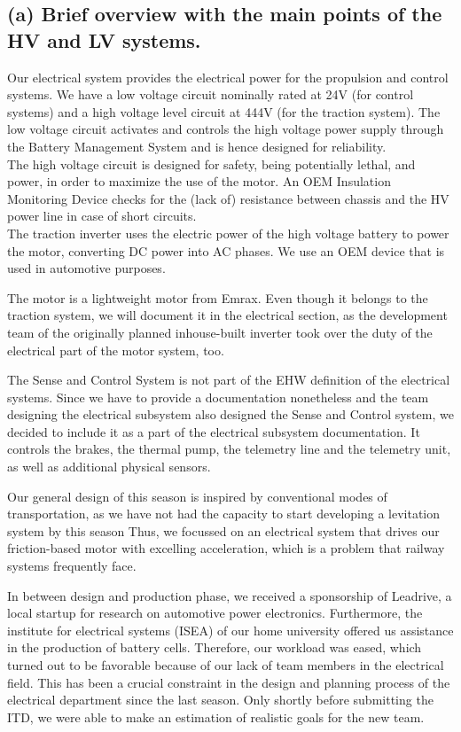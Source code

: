 \subsection{(a) Brief overview with the main points of the HV and LV systems.}
Our electrical system provides the electrical power for the propulsion and control systems. We have a low voltage circuit nominally rated at 24V (for control systems) and a high voltage level circuit at 444V (for the traction system).
The low voltage circuit activates and controls the high voltage power supply through the Battery Management System and is hence designed for reliability. \\
The high voltage circuit is designed for safety, being potentially lethal, and power, in order to maximize the use of the motor. An OEM Insulation Monitoring Device checks for the (lack of) resistance between chassis and the HV power line in case of short circuits. \\
The traction inverter uses the electric power of
the high voltage battery to power the motor, 
converting DC power into AC phases. We use an 
OEM device that is used in automotive purposes. 
\\
\par The motor is a lightweight motor from Emrax. Even though it belongs to the traction system,
we will document it in the electrical section, 
as the development team of the originally
planned inhouse-built inverter took over the 
duty of the electrical part of the
motor system, too.
\par The Sense and Control System is not part of the EHW definition of the electrical systems. Since we have to provide a documentation nonetheless and the team designing the electrical subsystem also designed the Sense and Control system, we decided to include it as a part of the electrical subsystem documentation. It controls the brakes, the thermal pump, the telemetry line and the telemetry unit, as well as additional physical sensors. 

\par Our general design of this season is inspired by conventional modes of transportation,
as we have not had the capacity to start developing a levitation system by this season
Thus, we focussed on an electrical system that drives our friction-based motor with
excelling acceleration, which is a problem that railway systems frequently face.

\par In between design and production phase, we received a sponsorship of Leadrive,
a local startup for research on automotive power electronics.
Furthermore, the institute for electrical systems (ISEA) of our home university offered us assistance in the production of battery cells.
Therefore, our workload was eased, which turned out to be favorable
because of our lack of team members in the electrical field. This has been a crucial
constraint in the design and planning process of the electrical department
since the last season. Only shortly before submitting the ITD, we were able to make an estimation of
realistic goals for the new team.

